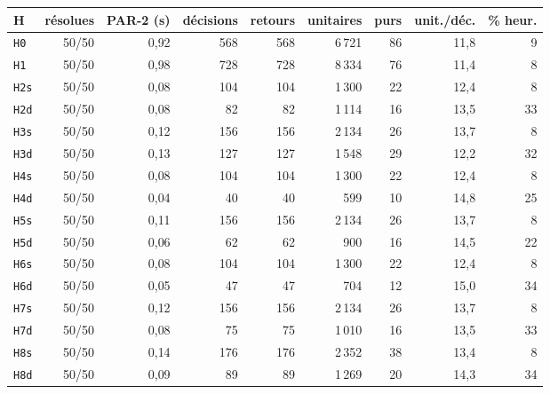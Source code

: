 \begin{tabular}{lrrrrrrrr}
\toprule
H & résolues & PAR-2 (s) & décisions & retours & unitaires & purs & unit./déc. & \% heur. \\
\midrule
\texttt{H0} & 50/50 & 0{,}92 & 568 & 568 & 6\,721 & 86 & 11{,}8 & 9 \\
\texttt{H1} & 50/50 & 0{,}98 & 728 & 728 & 8\,334 & 76 & 11{,}4 & 8 \\
\texttt{H2s} & 50/50 & 0{,}08 & 104 & 104 & 1\,300 & 22 & 12{,}4 & 8 \\
\texttt{H2d} & 50/50 & 0{,}08 & 82 & 82 & 1\,114 & 16 & 13{,}5 & 33 \\
\texttt{H3s} & 50/50 & 0{,}12 & 156 & 156 & 2\,134 & 26 & 13{,}7 & 8 \\
\texttt{H3d} & 50/50 & 0{,}13 & 127 & 127 & 1\,548 & 29 & 12{,}2 & 32 \\
\texttt{H4s} & 50/50 & 0{,}08 & 104 & 104 & 1\,300 & 22 & 12{,}4 & 8 \\
\texttt{H4d} & 50/50 & 0{,}04 & 40 & 40 & 599 & 10 & 14{,}8 & 25 \\
\texttt{H5s} & 50/50 & 0{,}11 & 156 & 156 & 2\,134 & 26 & 13{,}7 & 8 \\
\texttt{H5d} & 50/50 & 0{,}06 & 62 & 62 & 900 & 16 & 14{,}5 & 22 \\
\texttt{H6s} & 50/50 & 0{,}08 & 104 & 104 & 1\,300 & 22 & 12{,}4 & 8 \\
\texttt{H6d} & 50/50 & 0{,}05 & 47 & 47 & 704 & 12 & 15{,}0 & 34 \\
\texttt{H7s} & 50/50 & 0{,}12 & 156 & 156 & 2\,134 & 26 & 13{,}7 & 8 \\
\texttt{H7d} & 50/50 & 0{,}08 & 75 & 75 & 1\,010 & 16 & 13{,}5 & 33 \\
\texttt{H8s} & 50/50 & 0{,}14 & 176 & 176 & 2\,352 & 38 & 13{,}4 & 8 \\
\texttt{H8d} & 50/50 & 0{,}09 & 89 & 89 & 1\,269 & 20 & 14{,}3 & 34 \\
\bottomrule
\end{tabular}
